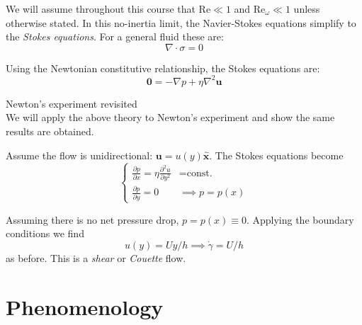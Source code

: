 \documentclass{jknotes}
\begin{document}
We will assume throughout this course that $\text{Re} \ll 1$ and
$\text{Re}_\omega \ll 1$ unless otherwise stated. In this no-inertia limit,
the Navier-Stokes equations simplify to the \emph{Stokes equations}. For a
general fluid these are:
\begin{equation}
	\nabla \cdot \sigma = 0
\end{equation}

Using the Newtonian constitutive relationship, the Stokes equations are:
\begin{equation}
	\bm{0} = -\nabla p + \eta \nabla^2 \bm{u}
\end{equation}

\begin{eg}{Newton's experiment revisited\\}
	We will apply the above theory to Newton's experiment and show the same
	results are obtained.

	\begin{center}
	\end{center}

	Assume the flow is unidirectional: $\bm{u} = u(y) \hat{\bm{x}}$. The
	Stokes equations become
	\begin{equation}
	\begin{cases}
		\frac{\partial p}{\partial x} = \eta \frac{\partial^2 u}{\partial y^2}
		& = \text{const.}
		\\
		\frac{\partial  p}{\partial y} = 0 & \implies p=p(x)
	\end{cases}
	\end{equation}

	Assuming there is no net pressure drop, $p = p(x) \equiv 0$. Applying the
	boundary conditions we find 
	\begin{equation}
		u(y) = Uy/h \implies \dot{\gamma} = U/h
	\end{equation}
	as before. This is a \emph{shear} or \emph{Couette} flow.
\end{eg}

\section{Phenomenology}
\end{document}
